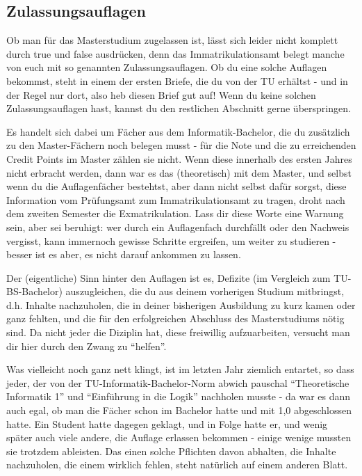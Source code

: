 \begin{multicols}{2}
\subsection{Zulassungsauflagen}
Ob man für das Masterstudium zugelassen ist, lässt sich leider nicht komplett durch true und false ausdrücken, denn das Immatrikulationsamt belegt manche von euch mit so genannten Zulassungsauflagen. Ob du eine solche Auflagen bekommst, steht in einem der ersten Briefe, die du von der TU erhältst - und in der Regel nur dort, also heb diesen Brief gut auf! Wenn du keine solchen Zulassungsauflagen hast, kannst du den restlichen Abschnitt gerne überspringen.

Es handelt sich dabei um Fächer aus dem Informatik-Bachelor, die du zusätzlich zu den Master-Fächern noch belegen musst - für die Note und die zu erreichenden Credit Points im Master zählen sie nicht. Wenn diese innerhalb des ersten Jahres nicht erbracht werden, dann war es das (theoretisch) mit dem Master, und selbst wenn du die Auflagenfächer bestehtst, aber dann nicht selbst dafür sorgst, diese Information vom Prüfungsamt zum Immatrikulationsamt zu tragen, droht nach dem zweiten Semester die Exmatrikulation. Lass dir diese Worte eine Warnung sein, aber sei beruhigt: wer durch ein Auflagenfach durchfällt oder den Nachweis vergisst, kann immernoch gewisse Schritte ergreifen, um weiter zu studieren - besser ist es aber, es nicht darauf ankommen zu lassen.

Der (eigentliche) Sinn hinter den Auflagen ist es, Defizite (im Vergleich zum TU-BS-Bachelor) auszugleichen, die du aus deinem vorherigen Studium mitbringst, d.h. Inhalte nachzuholen, die in deiner bisherigen Ausbildung zu kurz kamen oder ganz fehlten, und die für den erfolgreichen Abschluss des Masterstudiums nötig sind. Da nicht jeder die Diziplin hat, diese freiwillig aufzuarbeiten, versucht man dir hier durch den Zwang zu "`helfen"'.

Was vielleicht noch ganz nett klingt, ist im letzten Jahr ziemlich entartet, so dass jeder, der von der TU-Informatik-Bachelor-Norm abwich pauschal "`Theoretische Informatik 1"' und "`Einführung in die Logik"' nachholen musste - da war es dann auch egal, ob man die Fächer schon im Bachelor hatte und mit 1,0 abgeschlossen hatte. Ein Student hatte dagegen geklagt, und in Folge hatte er, und wenig später auch viele andere, die Auflage erlassen bekommen - einige wenige mussten sie trotzdem ableisten. Das einen solche Pflichten davon abhalten, die Inhalte nachzuholen, die einem wirklich fehlen, steht natürlich auf einem anderen Blatt.


\end{multicols}
